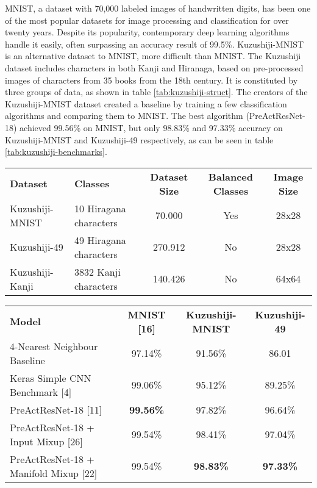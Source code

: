 MNIST, a dataset with 70,000 labeled images of handwritten digits, has been one of the most popular datasets for image processing and classification for over twenty years. Despite its popularity, contemporary deep learning algorithms handle it easily, often surpassing an accuracy result of 99.5\%. Kuzushiji-MNIST \cite{Clanuwat2018-vm} is an alternative dataset to MNIST, more difficult than MNIST. The Kuzushiji dataset includes characters in both Kanji and Hiranaga, based on pre-processed images of characters from 35 books from the 18th century. It is constituted by three groups of data, as shown in table \ref{tab:kuzushiji-struct}. The creators of the Kuzushiji-MNIST dataset created a baseline by training a few classification algorithms and comparing them to MNIST. The best algorithm (PreActResNet-18) achieved 99.56\% on MNIST, but only 98.83\% and 97.33\% accuracy on Kuzushiji-MNIST and Kuzushiji-49 respectively, as can be seen in table \ref{tab:kuzushiji-benchmarks}.

\begin{table*}
	\begin{tabular}{llccc}
		\rowcolor[HTML]{EFEFEF}
		\textbf{Dataset} & \textbf{Classes}       & \textbf{Dataset Size} & \textbf{Balanced Classes} & \textbf{Image Size} \\
		Kuzushiji-MNIST  & 10 Hiragana characters & 70.000                & Yes                       & 28x28               \\
		Kuzushiji-49     & 49 Hiragana characters & 270.912               & No                        & 28x28               \\
		Kuzushiji-Kanji  & 3832 Kanji characters  & 140.426               & No                        & 64x64
	\end{tabular}
	\caption{Description of the structure of the Kuzushiji-MNIST dataset from \cite{Clanuwat2018-vm}.}
	\label{tab:kuzushiji-struct}
\end{table*}

\begin{table*}
	\begin{tabular}{lccc}
		\rowcolor[HTML]{EFEFEF}
		\textbf{Model}                            & \textbf{MNIST {[}16{]}} & \textbf{Kuzushiji-MNIST} & \textbf{Kuzushiji-49} \\
		4-Nearest Neighbour Baseline              & 97.14\%                 & 91.56\%                  & 86.01                 \\
		Keras Simple CNN Benchmark {[}4{]}        & 99.06\%                 & 95.12\%                  & 89.25\%               \\
		PreActResNet-18 {[}11{]}                  & \textbf{99.56\%}        & 97.82\%                  & 96.64\%               \\
		PreActResNet-18 + Input Mixup {[}26{]}    & 99.54\%                 & 98.41\%                  & 97.04\%               \\
		PreActResNet-18 + Manifold Mixup {[}22{]} & 99.54\%                 & \textbf{98.83\%}         & \textbf{97.33\%}
	\end{tabular}
	\caption{Benchmarks on the Kuzushiji-MNIST dataset from \cite{Clanuwat2018-vm}.}
	\label{tab:kuzushiji-benchmarks}
\end{table*}